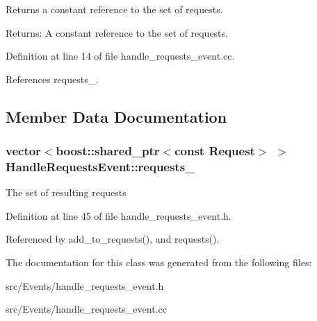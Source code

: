 Returns a constant reference to the set of requests. \begin{Desc}
\item[Returns:]A constant reference to the set of requests. \end{Desc}


Definition at line 14 of file handle\_\-requests\_\-event.cc.

References requests\_\-.

\subsection{Member Data Documentation}
\hypertarget{class_handle_requests_event_38fd31bb391f81b55c1ec15de8a4bd00}{
\subsubsection[requests\_\-]{\setlength{\rightskip}{0pt plus 5cm}vector$<$boost::shared\_\-ptr$<$const {\bf Request}$>$ $>$ {\bf HandleRequestsEvent::requests\_\-}}}
\label{class_handle_requests_event_38fd31bb391f81b55c1ec15de8a4bd00}


The set of resulting requests 

Definition at line 45 of file handle\_\-requests\_\-event.h.

Referenced by add\_\-to\_\-requests(), and requests().

The documentation for this class was generated from the following files:\begin{CompactItemize}
\item 
src/Events/handle\_\-requests\_\-event.h\item 
src/Events/handle\_\-requests\_\-event.cc\end{CompactItemize}
